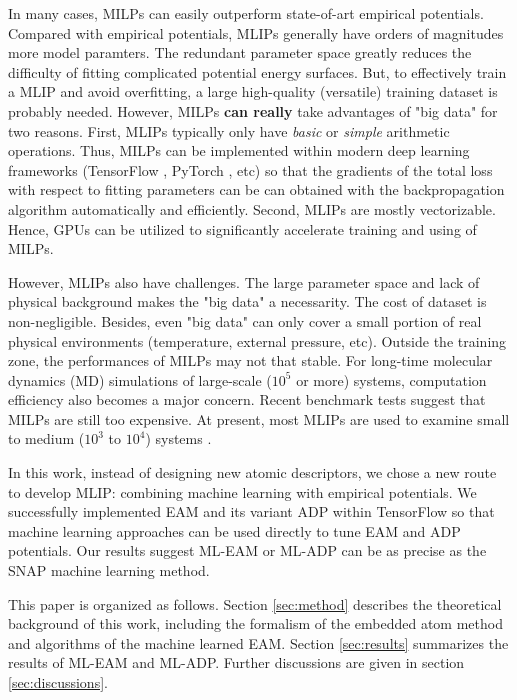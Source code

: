 \documentclass[prb,reprint]{revtex4-2}
\begin{document}
In many cases, MILPs can easily outperform state-of-art empirical potentials. 
Compared with empirical potentials, MLIPs generally have orders of magnitudes 
more model paramters. The redundant parameter space greatly reduces the 
difficulty of fitting complicated potential energy surfaces. But, to effectively 
train a MLIP and avoid overfitting, a large high-quality (versatile) training 
dataset is probably needed. However, MILPs \textbf{can really} take advantages 
of "big data" for two reasons. First, MLIPs typically only have 
\textit{basic} or \textit{simple} arithmetic operations. Thus, MILPs can be 
implemented within modern deep learning frameworks 
(TensorFlow \cite{tensorflow}, PyTorch \cite{pytorch}, etc) 
so that the gradients of the total loss with respect to fitting parameters can 
be can obtained with the backpropagation algorithm automatically and 
efficiently. Second, MLIPs are mostly vectorizable. Hence, GPUs can be utilized
to significantly accelerate training and using of MILPs.

However, MLIPs also have challenges. The large parameter space and lack of 
physical background makes the "big data" a necessarity. The cost of dataset is 
non-negligible. Besides, even "big data" can only cover a small portion of real 
physical environments (temperature, external pressure, etc). Outside the 
training zone, the performances of MILPs may not that stable. For long-time 
molecular dynamics (MD) simulations of large-scale ($10^5$ or more) systems, 
computation efficiency also becomes a major concern. Recent benchmark 
tests \cite{SnapBenchmark} suggest that MILPs are still too expensive. 
At present, most MLIPs are used to examine small to medium ($10^3$ to $10^4$) 
systems \cite{SNAP,SFApp0,SFApp1,SFApp2,soap3}.

In this work, instead of designing new atomic descriptors, we chose a new route 
to develop MLIP: combining machine learning with empirical potentials. We 
successfully implemented EAM and its variant ADP within TensorFlow so that 
machine learning approaches can be used directly to tune EAM and ADP potentials. 
Our results suggest ML-EAM or ML-ADP can be as precise as the SNAP machine 
learning method. 

This paper is organized as follows. Section \ref{sec:method} describes the 
theoretical background of this work, including the formalism of the embedded 
atom method and algorithms of the machine learned EAM. Section \ref{sec:results} 
summarizes the results of ML-EAM and ML-ADP. Further discussions are given in 
section \ref{sec:discussions}.
\end{document}
